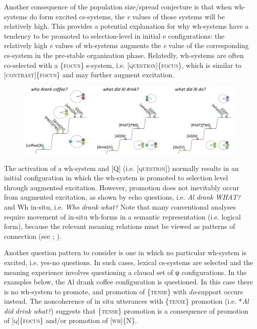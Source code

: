   Another consequence of the population size/spread conjecture is that when wh-systems do form excited cs-systems, the \textit{e} values of those systems will be relatively high. This provides a potential explanation for why wh-systems have a tendency to be promoted to selection-level in initial e configurations: the relatively high \textit{e} values of wh-systems augments the \textit{e} value of the corresponding cs-system in the pre-stable organization phase. Relatedly, wh-systems are often co-selected with a \{\textsc{focus}\} s-system, i.e. [\textsc{question}]\{\textsc{focus}\}, which is similar to [\textsc{contrast}]\{\textsc{focus}\} and may further augment excitation.

  
\begin{figure}
\includegraphics[width=\textwidth]{figures/Tilsen-img159.png}
\caption{\missingcaption}
\label{fig:}
\end{figure}
 

  The activation of a wh-system and [Q] (i.e. [\textsc{question}]) normally results in an initial configuration in which the wh-system is promoted to selection level through augmented excitation. However, promotion does not inevitably occur from augmented excitation, as shown by echo questions, i.e. \textit{Al} \textit{drank} \textit{WHAT?} and Wh in-situ, i.e. \textit{Who} \textit{drank} \textit{what?} Note that many conventional analyses require movement of in-situ wh-forms in a semantic representation (i.e. logical form), because the relevant meaning relations must be viewed as patterns of connection (see \citealt{Reinhart1998}; \citealt{Watanabe1992}).

  Another question pattern to consider is one in which no particular wh-system is excited, i.e. yes-no questions. In such cases, lexical cs-systems are selected and the meaning experience involves questioning a clausal set of φ configurations. In the examples below, the {\textbar}Al drank coffee{\textbar} configuration is questioned. In this case there is no wh-system to promote, and promotion of \{\textsc{tense}\} with \textit{do}{}-support occurs instead. The noncoherence of in situ utterances with \{\textsc{tense}\} promotion (i.e. *\textit{Al} \textit{did} \textit{drink} \textit{what?}) suggests that \{\textsc{tense}\} promotion is a consequence of promotion of [\textsc{q}]\{\textsc{focus}\} and/or promotion of [\textsc{wh}]\{N\}. 

